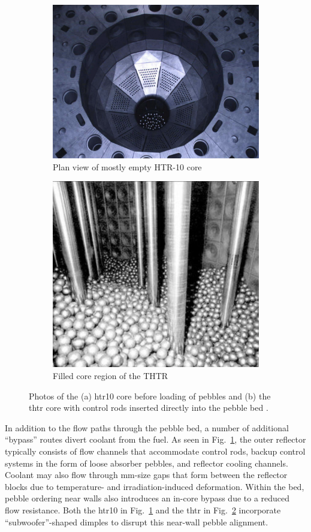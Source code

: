 \begin{figure}[!h]
\centering
\begin{subfigure}{.485\textwidth}
  \centering
  \includegraphics[height=0.5\linewidth]{figs/htr10.png}
  \caption{Plan view of mostly empty HTR-10 core}
  \label{fig:corea}
\end{subfigure}
\begin{subfigure}{.485\textwidth}
  \centering
  \includegraphics[height=0.5\linewidth]{figs/thtr_core.png}
  \caption{Filled core region of the THTR}
  \label{fig:coreb}
\end{subfigure}
\caption{Photos of the (a) \gls{htr10} core before loading of pebbles \cite{HTGRLessonsLearned} and (b) the \gls{thtr} core with control rods inserted directly into the pebble bed \cite{thtr_core}.}
\label{fig:core}
\end{figure}

In addition to the flow paths through the pebble bed, a number of additional ``bypass'' routes divert coolant from the fuel. As seen in Fig.\ \ref{fig:corea}, the outer reflector typically consists of flow channels that accommodate control rods, backup control systems in the form of loose absorber pebbles, and reflector cooling channels. Coolant may also flow through \si{\milli\meter}-size gaps that form between the reflector blocks due to temperature- and irradiation-induced deformation. Within the bed, pebble ordering near walls also introduces an in-core bypass due to a reduced flow resistance. Both the \gls{htr10} in Fig.\ \ref{fig:corea} and the \gls{thtr} in Fig.\ \ref{fig:coreb} incorporate ``subwoofer''-shaped dimples to disrupt this near-wall pebble alignment.

